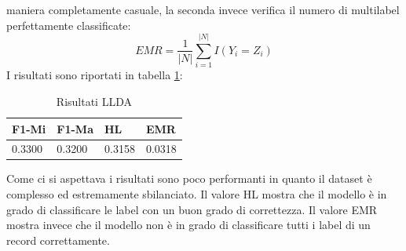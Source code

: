 \documentclass[technote]{IEEEtran}
\begin{document}
maniera completamente casuale, la seconda invece verifica il numero
di multilabel perfettamente classificate:\\
\begin{equation}
EMR = \frac{1}{|N|}\sum_{i=1}^{|N|}I(Y_i = Z_i)
\end{equation}
I risultati sono riportati in tabella \ref{t_res_llda}:\\
\begin{table}[H]
\centering
\caption{Risultati LLDA}
\begin{tabular}{|l|l|l|l|}
\hline
\textbf{F1-Mi} & \textbf{F1-Ma} & \textbf{HL} & \textbf{EMR} \\ \hline
0.3300         & 0.3200         & 0.3158      & 0.0318       \\ \hline
\end{tabular}
\label{t_res_llda}
\end{table}
Come ci si aspettava i risultati sono poco performanti in quanto il dataset
è complesso ed estremamente sbilanciato.
Il valore HL mostra che il modello \`e in grado di classificare le label
con un buon grado di correttezza. Il valore EMR mostra invece che
il modello non \`e in grado di classificare tutti i label di un record
correttamente. 

\end{document}
